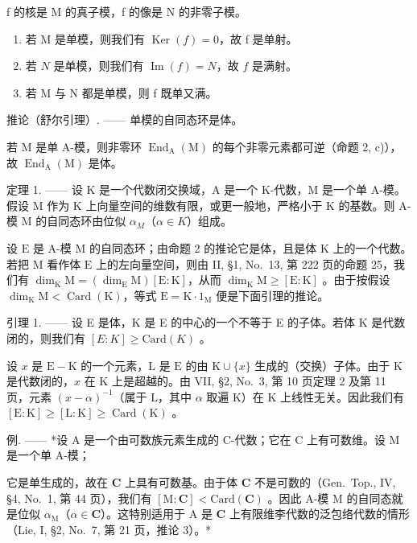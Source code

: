 f 的核是 M 的真子模，f 的像是 N 的非零子模。

\begin{enumerate}
\def\labelenumi{\alph{enumi})}
\item
  若 M 是单模，则我们有 \(\operatorname{Ker}(f)=0\)，故 f 是单射。
\item
  若 \(N\) 是单模，则我们有 \(\operatorname{Im}(f) = N\)，故 \(f\) 是满射。
\item
  若 M 与 N 都是单模，则 f 既单又满。
\end{enumerate}

推论（舒尔引理）. —— 单模的自同态环是体。

若 M 是单 A-模，则非零环 \(\operatorname{End}_{\mathrm{A}}(\mathrm{M})\) 的每个非零元素都可逆（命题 2, c)），故 \(\operatorname{End}_{\mathrm{A}}(\mathrm{M})\) 是体。

定理 1. —— 设 K 是一个代数闭交换域，A 是一个 K-代数，M 是一个单 A-模。假设 M 作为 K 上向量空间的维数有限，或更一般地，严格小于 K 的基数。则 A-模 M 的自同态环由位似 \(\alpha_{M}\)（\(\alpha \in K\)）组成。

设 \(\mathrm{E}\) 是 A-模 \(\mathrm{M}\) 的自同态环；由命题 2 的推论它是体，且是体 \(\mathrm{K}\) 上的一个代数。若把 \(\mathrm{M}\) 看作体 \(\mathrm{E}\) 上的左向量空间，则由 II, §1, No.~13, 第 222 页的命题 25，我们有 \(\dim_{\mathrm{K}} \mathrm{M} = (\dim_{\mathrm{E}} \mathrm{M})[\mathrm{E} : \mathrm{K}]\)，从而 \(\dim_{\mathrm{K}} \mathrm{M} \geqslant [\mathrm{E} : \mathrm{K}]\) 。由于按假设 \(\dim_{\mathrm{K}} \mathrm{M} < \operatorname{Card}(\mathrm{K})\)，等式 \(\mathrm{E} = \mathrm{K} \cdot 1_{\mathrm{M}}\) 便是下面引理的推论。

引理 1. —— 设 E 是体，K 是 E 的中心的一个不等于 E 的子体。若体 K 是代数闭的，则我们有 \([E:K] \geqslant \text{Card}(K)\) 。

设 \(x\) 是 \(\mathrm{E} - \mathrm{K}\) 的一个元素，\(\mathrm{L}\) 是 \(\mathrm{E}\) 的由 \(\mathrm{K} \cup \{x\}\) 生成的（交换）子体。由于 \(\mathrm{K}\) 是代数闭的，\(x\) 在 \(\mathrm{K}\) 上是超越的。由 VII, §2, No.~3, 第 10 页定理 2 及第 11 页，元素 \((x - \alpha)^{-1}\)（属于 \(\mathrm{L}\)，其中 \(\alpha\) 取遍 \(\mathrm{K}\)）在 \(\mathrm{K}\) 上线性无关。因此我们有 \([\mathrm{E} : \mathrm{K}] \geqslant [\mathrm{L} : \mathrm{K}] \geqslant \operatorname{Card}(\mathrm{K})\) 。

例. —— *设 A 是一个由可数族元素生成的 C-代数；它在 C 上有可数维。设 M 是一个单 A-模；

它是单生成的，故在 \(\mathbf{C}\) 上具有可数基。由于体 \(\mathbf{C}\) 不是可数的（Gen.~Top., IV, §4, No.~1, 第 44 页），我们有 \([\mathrm{M}:\mathbf{C}] < \mathrm{Card}(\mathbf{C})\) 。因此 A-模 M 的自同态就是位似 \(\alpha_{\mathrm{M}}\)（\(\alpha \in \mathbf{C}\)）。这特别适用于 A 是 \(\mathbf{C}\) 上有限维李代数的泛包络代数的情形（Lie, I, §2, No.~7, 第 21 页，推论 3）。*

